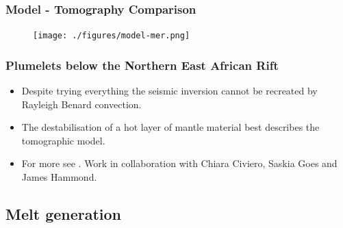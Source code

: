 \documentclass[aspectratio=169]{beamer}
\begin{document}
\begin{frame}
    \frametitle{Model - Tomography Comparison}
    \begin{figure}
        \vspace{-0.5cm}
        \texttt{[image: ./figures/model-mer.png]}
    \end{figure}
\end{frame}

\begin{frame}
    \frametitle{Plumelets below the Northern East African Rift}
    \begin{itemize}
    \item{Despite trying everything the seismic inversion cannot be recreated by Rayleigh Benard convection.}
    \item{The destabilisation of a hot layer of mantle material best describes the tomographic model.}
    \item{For more see \cite{civiero-etal-2020}. Work in collaboration with Chiara Civiero, Saskia Goes and James Hammond.}
    \end{itemize}
\end{frame}

\subsection{Melt generation}
\end{document}
